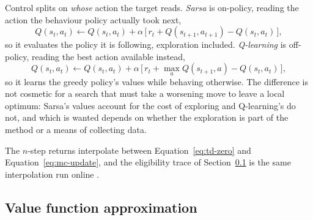 \documentclass[11pt,a4paper]{article}
\begin{document}
Control splits on \emph{whose} action the target reads. \emph{Sarsa} is
on-policy, reading the action the behaviour policy actually took next,
\begin{equation}
  Q(s_t, a_t) \gets Q(s_t, a_t)
    + \alpha\,\big[\, r_t + Q(s_{t+1}, a_{t+1}) - Q(s_t, a_t) \,\big],
  \label{eq:sarsa}
\end{equation}
so it evaluates the policy it is following, exploration included.
\emph{Q-learning} is off-policy, reading the best action available instead,
\begin{equation}
  Q(s_t, a_t) \gets Q(s_t, a_t)
    + \alpha\,\big[\, r_t + \max_{a} Q(s_{t+1}, a) - Q(s_t, a_t) \,\big],
  \label{eq:q-learning}
\end{equation}
so it learns the greedy policy's values while behaving otherwise. The
difference is not cosmetic for a search that must take a worsening move to
leave a local optimum: Sarsa's values account for the cost of exploring and
Q-learning's do not, and which is wanted depends on whether the exploration is
part of the method or a means of collecting data.

The $n$-step returns interpolate between Equation~\ref{eq:td-zero} and
Equation~\ref{eq:mc-update}, and the eligibility trace of
Section~\ref{app:rl:vfa} is the same interpolation run online
\citep[Ch.~7]{suttonbarto2018}.

\subsection{Value function approximation}
\label{app:rl:vfa}
\end{document}
